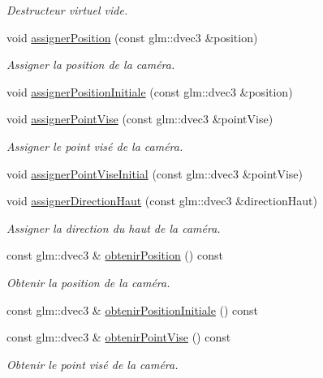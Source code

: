 \begin{DoxyCompactItemize}
\begin{DoxyCompactList}\small\item\em Destructeur virtuel vide. \end{DoxyCompactList}\item 
void \hyperlink{classvue_1_1_camera_a452efa2c96225b1207cc9ac74be0bda5}{assigner\+Position} (const glm\+::dvec3 \&position)
\begin{DoxyCompactList}\small\item\em Assigner la position de la caméra. \end{DoxyCompactList}\item 
void \hyperlink{classvue_1_1_camera_a73e6c0d4915b3ee6f007e0630fb7dcc0}{assigner\+Position\+Initiale} (const glm\+::dvec3 \&position)
\item 
void \hyperlink{classvue_1_1_camera_a0b9982453adc3afc38f9198ab8b1dd2a}{assigner\+Point\+Vise} (const glm\+::dvec3 \&point\+Vise)
\begin{DoxyCompactList}\small\item\em Assigner le point visé de la caméra. \end{DoxyCompactList}\item 
void \hyperlink{classvue_1_1_camera_a38a36bcc9a9039f20c1f00ea6266bffb}{assigner\+Point\+Vise\+Initial} (const glm\+::dvec3 \&point\+Vise)
\item 
void \hyperlink{classvue_1_1_camera_a94afd2172d111edacc248522f201fd32}{assigner\+Direction\+Haut} (const glm\+::dvec3 \&direction\+Haut)
\begin{DoxyCompactList}\small\item\em Assigner la direction du haut de la caméra. \end{DoxyCompactList}\item 
const glm\+::dvec3 \& \hyperlink{classvue_1_1_camera_aca05463d00f938ceb637b49eaf25f330}{obtenir\+Position} () const 
\begin{DoxyCompactList}\small\item\em Obtenir la position de la caméra. \end{DoxyCompactList}\item 
const glm\+::dvec3 \& \hyperlink{classvue_1_1_camera_acdd25110918bd9019316568a838c717c}{obtenir\+Position\+Initiale} () const 
\item 
const glm\+::dvec3 \& \hyperlink{classvue_1_1_camera_a20cab3b4e97dbe681dc9532e459bbf08}{obtenir\+Point\+Vise} () const 
\begin{DoxyCompactList}\small\item\em Obtenir le point visé de la caméra. \end{DoxyCompactList}\item 

\end{DoxyCompactItemize}
